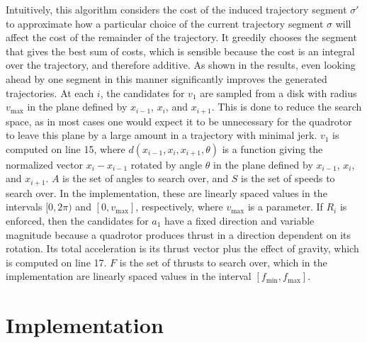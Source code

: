 \documentclass[pageno]{jpaper}
\begin{document}
Intuitively, this algorithm considers the cost of the induced trajectory segment $\sigma'$ to approximate how a particular choice of the current trajectory segment $\sigma$ will affect the cost of the remainder of the trajectory. It greedily chooses the segment that gives the best sum of costs, which is sensible because the cost is an integral over the trajectory, and therefore additive. As shown in the results, even looking ahead by one segment in this manner significantly improves the generated trajectories. At each $i$, the candidates for $v_1$ are sampled from a disk with radius $v_{\max}$ in the plane defined by $x_{i-1}$, $x_i$, and $x_{i+1}$. This is done to reduce the search space, as in most cases one would expect it to be unnecessary for the quadrotor to leave this plane by a large amount in a trajectory with minimal jerk. $v_1$ is computed on line 15, where $d(x_{i-1}, x_i, x_{i+1}, \theta)$ is a function giving the normalized vector $x_i - x_{i-1}$ rotated by angle $\theta$ in the plane defined by $x_{i-1}$, $x_i$, and $x_{i+1}$. $A$ is the set of angles to search over, and $S$ is the set of speeds to search over. In the implementation, these are linearly spaced values in the intervals $[0, 2\pi)$ and $[0, v_{\max}]$, respectively, where $v_{\max}$ is a parameter. If $R_i$ is enforced, then the candidates for $a_1$ have a fixed direction and variable magnitude because a quadrotor produces thrust in a direction dependent on its rotation. Its total acceleration is its thrust vector plus the effect of gravity, which is computed on line 17. $F$ is the set of thrusts to search over, which in the implementation are linearly spaced values in the interval $[f_{\min}, f_{\max}]$.

\section{Implementation}
\end{document}
